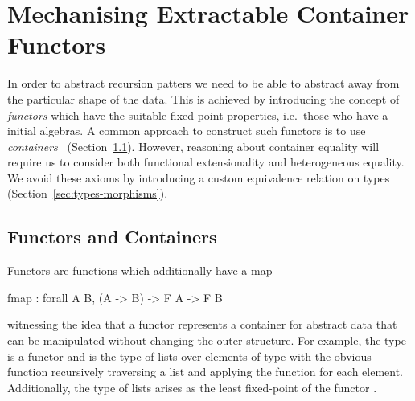 \documentclass[ a4paper, UKenglish, cleveref, autoref, thm-restate]{lipics-v2021}
\newcommand{\R}{\mathbb{R}}
\newcommand{\operator}[1]{\textsf{#1}}
\begin{document}

\section{Mechanising Extractable Container Functors}
\label{sec:containers}
In order to abstract recursion patters we need to be able to abstract away from
the particular shape of the data.  This is achieved by introducing the concept
of \emph{functors} which have the suitable fixed-point properties, i.e.\ those
who have a initial algebras. A common approach to construct such functors is to
use \emph{containers}~\cite{AbbottAG05} (Section~\ref{sec:functors}).
However, reasoning about container equality will require us to consider both
functional extensionality and heterogeneous equality. We avoid these axioms by
introducing a custom equivalence relation on types
(Section~\ref{sec:types-morphisms}).

\subsection{Functors and Containers}
\label{sec:functors}
Functors are functions  which additionally have a
map
\begin{coqcode}
fmap : forall A B, (A -> B) -> F A -> F B
\end{coqcode}
witnessing the idea that a
functor represents a container for abstract data that can be manipulated without
changing the outer structure. For example, the type  is
a functor and  is the type of lists over elements of type 
with the obvious  function recursively traversing a list and applying
the function  for each element. Additionally, the type of
lists  arises as the least fixed-point of the
functor .
\end{document}
